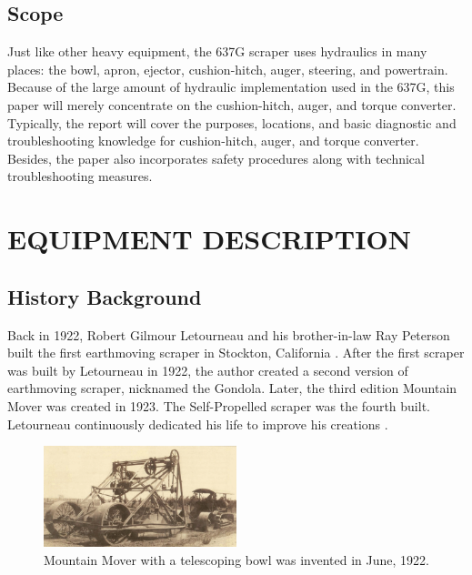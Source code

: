 \documentclass[a4paper,man,natbib]{apa6}
\begin{document}

\subsection{Scope}

Just like other heavy equipment, the 637G scraper uses hydraulics in many places: the bowl, apron, ejector, cushion-hitch, auger, steering, and powertrain. Because of the large amount of  hydraulic implementation used in the 637G, this paper will merely concentrate on the cushion-hitch, auger, and torque converter. Typically, the report will cover the purposes, locations, and basic diagnostic and troubleshooting knowledge for cushion-hitch, auger, and torque converter. Besides, the paper also incorporates safety procedures along with technical troubleshooting measures.

\section{EQUIPMENT DESCRIPTION}
\label{sec:examples}

\subsection{History Background}
 
Back in 1922, Robert Gilmour Letourneau and his brother-in-law Ray Peterson built the first earthmoving scraper in Stockton, California \citep[p. 35]{RLMBldng}. After the first scraper was built by Letourneau in 1922, the author created a second version of earthmoving scraper, nicknamed the Gondola. Later, the third edition Mountain Mover was created in 1923. The Self-Propelled scraper was the fourth built. Letourneau continuously dedicated his life to improve his creations \citep{RLMBldng}.

\begin{figure}[!ht]
\centering
\includegraphics[width=0.5\textwidth]{mountain_mover_1922.png}
\centering\caption{\label{fig:rthcr1}Mountain Mover with a telescoping bowl was invented in June, 1922. \citep{RLMBldng}}
\end{figure}
\end{document}
